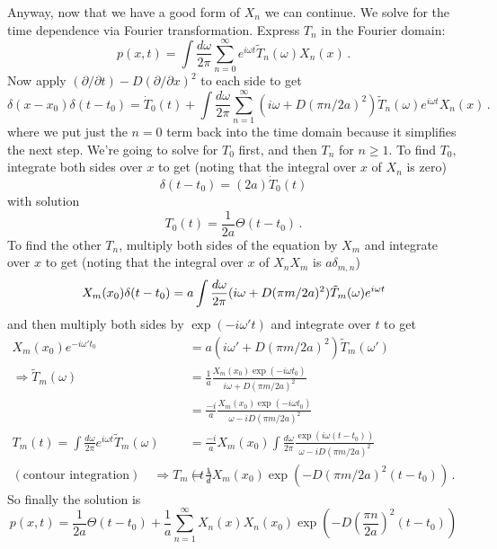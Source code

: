 Anyway, now that we have a good form of $X_n$ we can continue.
We solve for the time dependence via Fourier transformation.
Express $T_n$ in the Fourier domain:
\begin{equation*}
  p(x, t)
  = \int \frac{d\omega}{2\pi} \sum_{n=0}^\infty
    e^{i \omega t} \tilde{T}_n(\omega) X_n(x)
  \, .
\end{equation*}
Now apply $(\partial / \partial t) - D (\partial / \partial x)^2$ to each side to get
\begin{equation*}
  \delta(x - x_0) \delta(t - t_0)
    = \dot{T}_0(t) + \int \frac{d \omega}{2\pi}
    \sum_{n=1}^\infty (i \omega + D (\pi n / 2a)^2)
    \tilde{T}_n(\omega) e^{i \omega t}
    X_n(x)
  \, .
\end{equation*}
where we put just the $n=0$ term back into the time domain because it simplifies the next step.
We're going to solve for $T_0$ first, and then $T_n$ for $n \geq 1$.
To find $T_0$, integrate both sides over $x$ to get (noting that the integral over $x$ of $X_n$ is zero)
\begin{equation*}
  \delta(t - t_0) = (2 a) \dot{T}_0(t)
\end{equation*}
with solution
\begin{equation*}
  T_0(t) = \frac{1}{2 a} \Theta(t - t_0)
  \, .
\end{equation*}
To find the other $T_n$, multiply both sides of the equation by $X_m$ and integrate over $x$ to get (noting that the integral over $x$ of $X_n X_m$ is $a \delta_{m, n}$)
\begin{equation*}
  X_m(x_0) \delta(t - t_0)
  = a \int \frac{d\omega}{2\pi} (i\omega + D(\pi m / 2a)^2) \tilde{T}_m(\omega) e^{i \omega t} \\
\end{equation*}
and then multiply both sides by $\exp(-i \omega' t)$ and integrate over $t$ to get
\begin{align*}
  X_m(x_0) e^{-i \omega' t_0}
  &= a (i \omega' + D(\pi m / 2 a)^2) \tilde{T}_m(\omega') \\
  \Rightarrow \tilde{T}_m(\omega)
  &= \frac{1}{a} \frac{X_m(x_0) \exp(-i \omega t_0)}{i \omega + D (\pi m / 2 a)^2} \\
  &= \frac{-i}{a} \frac{X_m(x_0) \exp(-i \omega t_0)}{\omega - i D (\pi m / 2 a)^2} \\
  T_m(t) = \int \frac{d\omega}{2\pi} e^{i \omega t} \tilde{T}_m(\omega)
  &= \frac{-i}{a} X_m(x_0) \int \frac{d\omega}{2\pi} \frac{\exp(i \omega (t - t_0))}{\omega - i D (\pi m / 2 a)^2} \\
  (\text{contour integration}) \quad \Rightarrow
  T_m(t) &= \frac{1}{a} X_m(x_0) \exp \left( -D (\pi m / 2 a)^2 (t - t_0) \right)
  \, .
\end{align*}
So finally the solution is
\begin{equation*}
  p(x, t) = \frac{1}{2a} \Theta(t - t_0)
  + \frac{1}{a} \sum_{n=1}^\infty X_n(x) X_n(x_0) \exp \left( -D \left( \frac{\pi n}{2 a} \right)^2 (t - t_0) \right)
\end{equation*}
